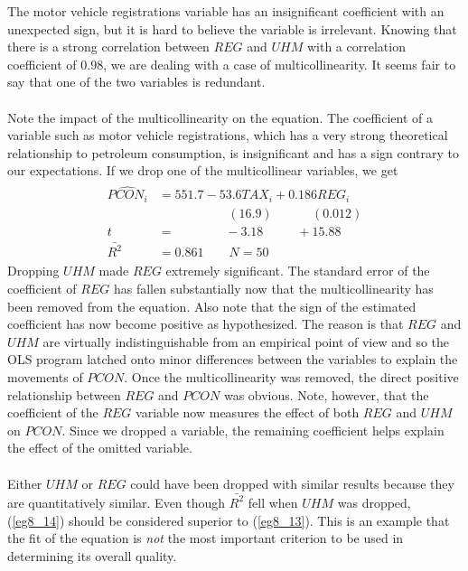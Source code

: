 \documentclass[11pt]{article}
\begin{document}
The motor vehicle registrations variable has an insignificant coefficient with an unexpected sign, but it is hard to believe the variable is irrelevant. Knowing that there is a strong correlation between $REG$ and $UHM$ with a correlation coefficient of $0.98$, we are dealing with a case of multicollinearity. It seems fair to say that one of the two variables is redundant. \\ \\
Note the impact of the multicollinearity on the equation. The coefficient of a variable such as motor vehicle registrations, which has a very strong theoretical relationship to petroleum consumption, is insignificant and has a sign contrary to our expectations. If we drop one of the multicollinear variables, we get
\begin{align}
\label{eg8_14}
\begin{split}
\widehat{PCON_i} &= 551.7 - {53.6TAX_i} + {0.186REG_i}\\
&\>\>\>\>\>\>\>\>\>\>\>\>\>\>\>\>\>\>\>\>\>\>\>\>\> (16.9) 
\>\>\>\>\>\>\>\>\>\>\>\>\>\> (0.012)\\
t&=\>\>\>\>\>\>\>\>\>\>\>\>\>\>\>\>\>\> -3.18 
\>\>\>\>\>\>\>\>\>\>\>\> +15.88\\
\bar{R^2}&= 0.861 \quad\quad N=50
\end{split}
\end{align}
Dropping $UHM$ made $REG$ extremely significant. The standard error of the coefficient of $REG$ has fallen substantially now that the multicollinearity has been removed from the equation. Also note that the sign of the estimated coefficient has now become positive as hypothesized. The reason is that $REG$ and $UHM$ are virtually indistinguishable from an empirical point of view and so the OLS program latched onto minor differences between the variables to explain the movements of $PCON$. Once the multicollinearity was removed, the direct positive relationship between $REG$ and $PCON$ was obvious. Note, however, that the coefficient of the $REG$ variable now measures the effect of both $REG$ and $UHM$ on $PCON$. Since we dropped a variable, the remaining coefficient helps explain the effect of the omitted variable. \\ \\
Either $UHM$ or $REG$ could have been dropped with similar results because they are quantitatively similar. Even though $\bar{R^2}$ fell when $UHM$ was dropped, (\ref{eg8_14}) should be considered superior to (\ref{eg8_13}). This is an example that the fit of the equation is \textit{not} the most important criterion to be used in determining its overall quality.
\end{document}
